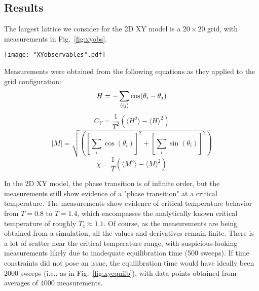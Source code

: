 \documentclass[twocolumn,aps]{revtex4-1} %
\begin{document}
\subsection{Results}

The largest lattice we consider for the 2D XY model is a $20 \times 20$ grid, with measurements in  Fig.~\ref{fig:xyobs}.
\begin{figure*}
	\texttt{[image: "XYobservables".pdf]}
	\caption{\label{fig:xyobs} Plots showing the mean energy per spin, specific heat per spin, mean (absolute) magnetization per spin, and magnetic susceptibility on a $20 \times 20$ lattice from $T = 0.8$ to $T = 1.4$ in increments of $\Delta T = 0.02$. The equilibration time was 500 sweeps and each data point was obtained from 1000 measurements. Spurious measurements, likely due to insufficient equilibration time, are marked with black crosses. Dashed lines on the right two plots represent the likely range of values for $T_c$ obtained from this simulation alone.}
\end{figure*}
Measurements were obtained from the following equations as they applied to the grid configuration:
\begin{equation}
H = -\sum_{\braket{ij}} \cos(\theta_i - \theta_j)
\end{equation}
\begin{equation}
C_V = \frac{1}{T^2} \left( \langle H^2 \rangle - \langle H \rangle^2 \right)
\end{equation}
\begin{equation}
\lvert M \rvert = \sqrt{ \left(   \left[\sum_i \cos(\theta_i) \right]^2    +   \left[\sum_i \sin(\theta_i) \right]^2    \right)}
\end{equation}
\begin{equation}
\chi = \frac{1}{T} \left( \langle M^2 \rangle - \langle M \rangle^2 \right)
\end{equation}

In the 2D XY model, the phase transition is of infinite order, but the measurements still show evidence of a "phase transition" at a critical temperature. The measurements show evidence of critical temperature behavior from $T = 0.8$ to $T = 1.4$, which encompasses the analytically known critical temperature of roughly $T_c \approx 1.1$. Of course, as the measurements are being obtained from a simulation, all the values and derivatives remain finite. There is a lot of scatter near the critical temperature range, with suspicious-looking measurements likely due to inadequate equilibration time (500 sweeps). If time constraints did not pose an issue, the equilibration time would have ideally been 2000 sweeps (i.e., as in Fig.~\ref{fig:xyequilb}), with data points obtained from averages of 4000 measurements. 
\end{document}
